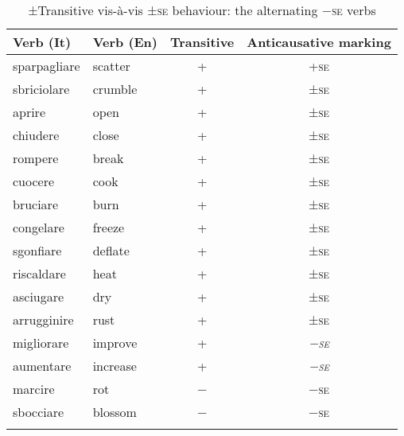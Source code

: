 \documentclass[output=paper,colorlinks,citecolor=brown
]{langscibook}
\begin{document}
\begin{table}
\caption{±Transitive vis-à-vis ±\textsc{se} behaviour: the alternating −\textsc{se} verbs}
\label{tab:bentley_table_3}
\begin{tabular}{llcc}
\lsptoprule
Verb (It)    & Verb (En) & Transitive & Anticausative marking \\
\midrule
sparpagliare & scatter   & +          & +\textsc{se}  \\
sbriciolare  & crumble   & +          & ±\textsc{se}  \\
aprire       & open      & +          & ±\textsc{se}  \\
chiudere     & close     & +          & ±\textsc{se}  \\
rompere      & break     & +          & ±\textsc{se}  \\
cuocere      & cook      & +          & ±\textsc{se}  \\
bruciare     & burn      & +          & ±\textsc{se}  \\
congelare    & freeze    & +          & ±\textsc{se}  \\
sgonfiare    & deflate   & +          & ±\textsc{se}  \\
riscaldare   & heat      & +          & ±\textsc{se}  \\
asciugare    & dry       & +          & ±\textsc{se}  \\
arrugginire  & rust      & +          & ±\textsc{se}  \\
\cellcolor[HTML]{BFBFBF}migliorare   & \cellcolor[HTML]{BFBFBF}improve   & \cellcolor[HTML]{BFBFBF}+          & \cellcolor[HTML]{BFBFBF}\textit{−\textsc{se}}   \\
\cellcolor[HTML]{BFBFBF}aumentare    & \cellcolor[HTML]{BFBFBF}increase  & \cellcolor[HTML]{BFBFBF}+          & \cellcolor[HTML]{BFBFBF}\textit{−\textsc{se}}   \\
marcire      & rot       & −          & −\textsc{se}  \\
sbocciare    & blossom   & −          & −\textsc{se}  \\              
\lspbottomrule
\end{tabular}
\end{table}
\end{document}
